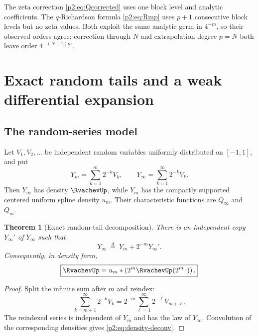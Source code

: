 \documentclass[11pt,oneside]{article}
\numberwithin{equation}{section}
\newtheorem{theorem}{Theorem}[section]
\theoremstyle{definition}
\theoremstyle{remark}
\begin{document}
\begin{remark}
The zeta correction \eqref{p2:eq:Qcorrected} uses one block level and analytic coefficients.
The $q$-Richardson formula \eqref{p2:eq:Rmp} uses $p+1$ consecutive block levels but no zeta
values.  Both exploit the same analytic germ in $4^{-m}$, so their observed orders agree:
correction through $N$ and extrapolation degree $p=N$ both leave order $4^{-(N+1)m}$.
\end{remark}

\section{Exact random tails and a weak differential expansion}
\label{p2:sec:probability}

\subsection{The random-series model}

Let $V_1,V_2,\ldots$ be independent random variables uniformly distributed on $[-1,1]$, and
put
\begin{equation}
 Y_m=\sum_{k=1}^{m}2^{-k}V_k,
 \qquad
 Y_\infty=\sum_{k=1}^{\infty}2^{-k}V_k.
 \label{p2:eq:Ydef}
\end{equation}
Then $Y_\infty$ has density $\RvachevUp$, while $Y_m$ has the compactly supported centered uniform
spline density $u_m$.  Their characteristic functions are $Q_\infty$ and $Q_m$.

\begin{theorem}[Exact random-tail decomposition]
\label{p2:thm:random-tail}
There is an independent copy $Y_\infty'$ of $Y_\infty$ such that
\begin{equation}
 \boxed{Y_\infty\ \stackrel{d}{=}\ Y_m+2^{-m}Y_\infty'.}
 \label{p2:eq:random-tail}
\end{equation}
Consequently, in density form,
\begin{equation}
 \boxed{
 \RvachevUp=u_m*\left(2^m\RvachevUp(2^m\,\cdot)\right).}
 \label{p2:eq:density-deconv}
\end{equation}
\newresult
\end{theorem}

\begin{proof}
Split the infinite sum after $m$ and reindex:
\[
 \sum_{k=m+1}^{\infty}2^{-k}V_k
 =2^{-m}\sum_{\ell=1}^{\infty}2^{-\ell}V_{m+\ell}.
\]
The reindexed series is independent of $Y_m$ and has the law of $Y_\infty$.  Convolution of
the corresponding densities gives \eqref{p2:eq:density-deconv}.
\end{proof}
\end{document}
